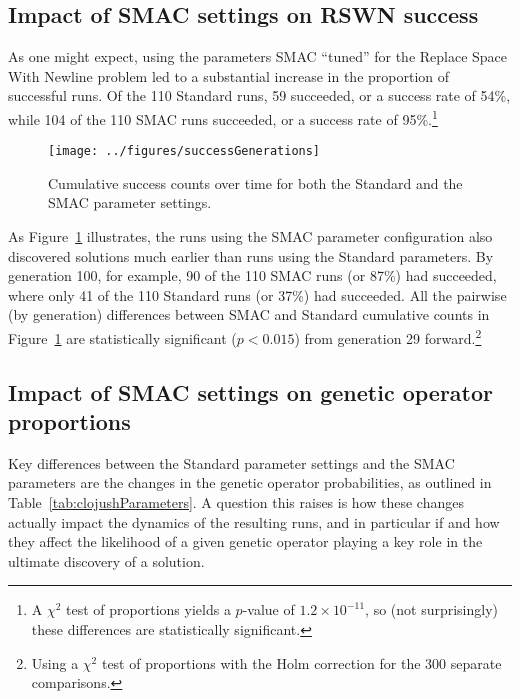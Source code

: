 \subsection{Impact of SMAC settings on RSWN success}
\label{sec:SMACsuccessRSWN}

As one might expect, using the parameters SMAC ``tuned'' for the
Replace Space With Newline problem led to a 
substantial increase in the proportion of successful runs. Of the 110
Standard runs, 59  succeeded, or a success rate of 54\%, while 104 of the
110 SMAC runs succeeded, or a success rate of 95\%.\footnote{A $\chi^2$ test of 
proportions yields a $p$-value of $1.2 \times 10^{-11}$, so (not surprisingly)
these differences are statistically significant.}

\begin{figure}
	\texttt{[image: ../figures/successGenerations]}
	\caption{Cumulative success counts over time for both the Standard
	and the SMAC parameter settings.}
	\label{fig:successGenerations}
\end{figure}

As Figure~\ref{fig:successGenerations} illustrates, the runs using the SMAC
parameter configuration also discovered solutions much earlier than runs using
the Standard parameters. By generation 100, for example, 90 of the 110 SMAC 
runs (or 87\%) had succeeded, where only 41 of the 110 Standard runs 
(or 37\%) had succeeded. All the pairwise (by generation) differences 
between SMAC and Standard cumulative counts in 
Figure~\ref{fig:successGenerations} are 
statistically significant ($p<0.015$)
from generation 29 forward.\footnote{Using a $\chi^2$ test of proportions 
	with the Holm correction for the 300 separate comparisons.}

\subsection{Impact of SMAC settings on genetic operator proportions}
\label{sec:SMACimpactRSWNops}

Key differences between the Standard parameter settings and the SMAC parameters
are the changes in the genetic operator probabilities, as outlined in
Table~\ref{tab:clojushParameters}. 
A question this raises is how these changes
actually impact the dynamics of the resulting runs, and in particular if and
how they affect the likelihood of a given genetic operator playing a key
role in the ultimate discovery of a solution.


